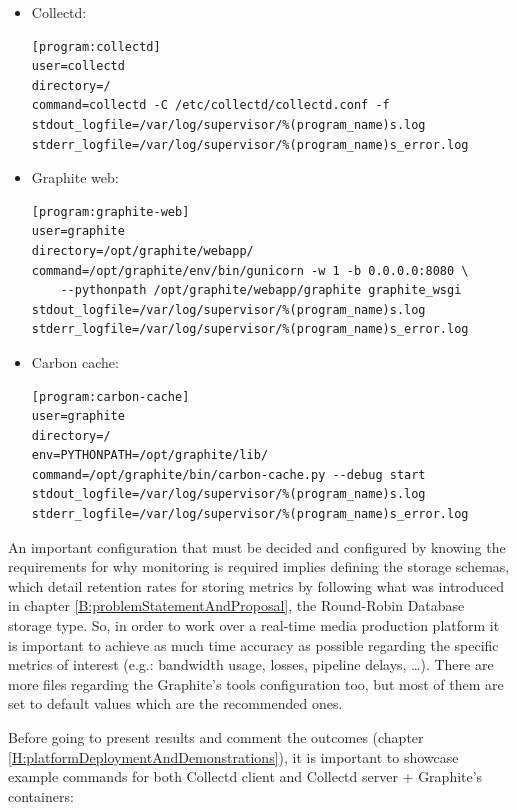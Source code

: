 \begin{itemize}
\item Collectd: \hfill

\begin{verbatim}
[program:collectd]
user=collectd
directory=/
command=collectd -C /etc/collectd/collectd.conf -f
stdout_logfile=/var/log/supervisor/%(program_name)s.log
stderr_logfile=/var/log/supervisor/%(program_name)s_error.log
\end{verbatim}
\item Graphite web: \hfill

\begin{verbatim}
[program:graphite-web]
user=graphite
directory=/opt/graphite/webapp/
command=/opt/graphite/env/bin/gunicorn -w 1 -b 0.0.0.0:8080 \
	--pythonpath /opt/graphite/webapp/graphite graphite_wsgi
stdout_logfile=/var/log/supervisor/%(program_name)s.log
stderr_logfile=/var/log/supervisor/%(program_name)s_error.log
\end{verbatim}

\item Carbon cache: \hfill

\begin{verbatim}
[program:carbon-cache]
user=graphite
directory=/
env=PYTHONPATH=/opt/graphite/lib/
command=/opt/graphite/bin/carbon-cache.py --debug start
stdout_logfile=/var/log/supervisor/%(program_name)s.log
stderr_logfile=/var/log/supervisor/%(program_name)s_error.log
\end{verbatim}
\end{itemize}

An important configuration that must be decided and configured by knowing the requirements for why monitoring is required implies defining the storage schemas, which detail retention rates for storing metrics by following what was introduced in chapter \ref{B:problemStatementAndProposal}, the Round-Robin Database storage type. So, in order to work over a real-time media production platform it is important to achieve as much time accuracy as possible regarding the specific metrics of interest (e.g.: bandwidth usage, losses, pipeline delays, \ldots). There are more files regarding the Graphite's tools configuration too, but most of them are set to default values which are the recommended ones. 

Before going to present results and comment the outcomes (chapter \ref{H:platformDeploymentAndDemonstrations}), it is important to showcase example commands for both Collectd client and Collectd server + Graphite's containers:


